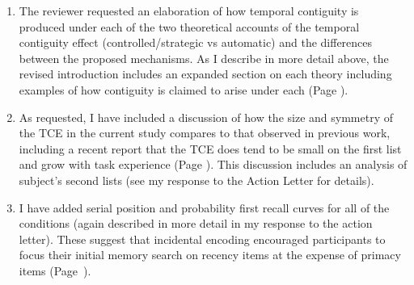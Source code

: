 \documentclass[12pt]{article}
\begin{document}
\begin{enumerate}

\item 
	The reviewer requested an elaboration of how temporal contiguity is produced under each of the two theoretical accounts of the temporal contiguity effect (controlled/strategic vs automatic) and the differences between the proposed mechanisms. As I describe in more detail above, the revised introduction includes an expanded section on each theory including examples of how contiguity is claimed to arise under each (Page \pageref{TODO-2}). 

\item
	As requested, I have included a discussion of how the size and symmetry of the TCE in the current study compares to that observed in previous work, including a recent report that the TCE does tend to be small on the first list and grow with task experience (Page \pageref{TODO-5}). This discussion includes an analysis of subject's second lists (see my response to the Action Letter for details). 
	
\item
	I have added serial position and probability first recall curves for all of the conditions (again described in more detail in my response to the action letter). These suggest that incidental encoding encouraged participants to focus their initial memory search on recency items at the expense of primacy items (Page~\pageref{SPCtalk}).



\end{enumerate}
\end{document}
